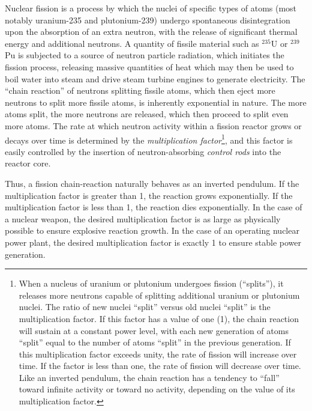 Nuclear fission is a process by which the nuclei of specific types of atoms (most notably uranium-235 and plutonium-239) undergo spontaneous disintegration upon the absorption of an extra neutron, with the release of significant thermal energy and additional neutrons.  A quantity of fissile material such as $^{235}$U or $^{239}$Pu is subjected to a source of neutron particle radiation, which initiates the fission process, releasing massive quantities of heat which may then be used to boil water into steam and drive steam turbine engines to generate electricity.  The ``chain reaction'' of neutrons splitting fissile atoms, which then eject more neutrons to split more fissile atoms, is inherently exponential in nature.  The more atoms split, the more neutrons are released, which then proceed to split even more atoms.  The rate at which neutron activity within a fission reactor grows or decays over time is determined by the \textit{multiplication factor}\footnote{When a nucleus of uranium or plutonium undergoes fission (``splits''), it releases more neutrons capable of splitting additional uranium or plutonium nuclei.  The ratio of new nuclei ``split'' versus old nuclei ``split'' is the multiplication factor.  If this factor has a value of one (1), the chain reaction will sustain at a constant power level, with each new generation of atoms ``split'' equal to the number of atoms ``split'' in the previous generation.  If this multiplication factor exceeds unity, the rate of fission will increase over time.  If the factor is less than one, the rate of fission will decrease over time.  Like an inverted pendulum, the chain reaction has a tendency to ``fall'' toward infinite activity or toward no activity, depending on the value of its multiplication factor.}, and this factor is easily controlled by the insertion of neutron-absorbing \textit{control rods} into the reactor core.      

Thus, a fission chain-reaction naturally behaves as an inverted pendulum.  If the multiplication factor is greater than 1, the reaction grows exponentially.  If the multiplication factor is less than 1, the reaction dies exponentially.  In the case of a nuclear weapon, the desired multiplication factor is as large as physically possible to ensure explosive reaction growth.  In the case of an operating nuclear power plant, the desired multiplication factor is exactly 1 to ensure stable power generation.

\filbreak

